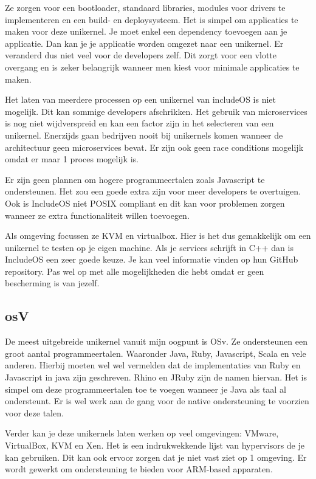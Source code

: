 \documentclass[pdftex,a4paper,12pt,twoside]{report}
\begin{document}
Ze zorgen voor een bootloader, standaard libraries, modules voor drivers te implementeren en een build- en deploysysteem. Het is simpel om applicaties te maken voor deze unikernel. Je moet enkel een dependency toevoegen aan je applicatie. Dan kan je je applicatie worden omgezet naar een unikernel. Er veranderd dus niet veel voor de developers zelf. Dit zorgt voor een vlotte overgang en is zeker belangrijk wanneer men kiest voor minimale applicaties te maken.

Het laten van meerdere processen op een unikernel van includeOS is niet mogelijk. Dit kan sommige developers afschrikken. Het gebruik van microservices is nog niet wijdverspreid en kan een factor zijn in het selecteren van een unikernel. Enerzijds gaan bedrijven nooit bij unikernels komen wanneer de architectuur geen microservices bevat. Er zijn ook geen race conditions mogelijk omdat er maar 1 proces mogelijk is.

Er zijn geen plannen om hogere programmeertalen zoals Javascript te ondersteunen. Het zou een goede extra zijn voor meer developers te overtuigen. Ook is IncludeOS niet POSIX compliant en dit kan voor problemen zorgen wanneer ze extra functionaliteit willen toevoegen. 

Als omgeving focussen ze KVM en virtualbox. Hier is het dus gemakkelijk om een unikernel te testen op je eigen machine. Als je services schrijft in C++ dan is IncludeOS een zeer goede keuze. Je kan veel informatie vinden op hun GitHub repository. Pas wel op met alle mogelijkheden die hebt omdat er geen bescherming is van jezelf.

\subsection{osV}

De meest uitgebreide unikernel vanuit mijn oogpunt is OSv. Ze ondersteunen een groot aantal programmeertalen. Waaronder Java, Ruby, Javascript, Scala en vele anderen. Hierbij moeten wel wel vermelden dat de implementaties van Ruby en Javascript in java zijn geschreven. Rhino en JRuby zijn de namen hiervan. Het is simpel om deze programmeertalen toe te voegen wanneer je Java als taal al ondersteunt. Er is wel werk aan de gang voor de native ondersteuning te voorzien voor deze talen.

Verder kan je deze unikernels laten werken op veel omgevingen: VMware, VirtualBox, KVM en Xen. Het is een indrukwekkende lijst van hypervisors de je kan gebruiken. Dit kan ook ervoor zorgen dat je niet vast ziet op 1 omgeving. Er wordt gewerkt om ondersteuning te bieden voor ARM-based apparaten.
\end{document}
